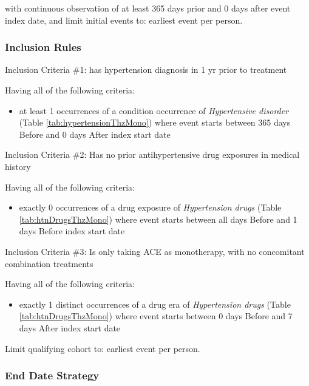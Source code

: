 \documentclass[11pt]{book}
\providecommand{\tightlist}{%
  \setlength{\itemsep}{0pt}\setlength{\parskip}{0pt}}
\theoremstyle{definition}
\theoremstyle{definition}
\theoremstyle{definition}
\theoremstyle{remark}
\begin{document}
with continuous observation of at least 365 days prior and 0 days after
event index date, and limit initial events to: earliest event per
person.

\subsubsection*{Inclusion Rules}\label{inclusion-rules-1}

Inclusion Criteria \#1: has hypertension diagnosis in 1 yr prior to
treatment

Having all of the following criteria:

\begin{itemize}
\tightlist
\item
  at least 1 occurrences of a condition occurrence of \emph{Hypertensive
  disorder} (Table \ref{tab:hypertensionThzMono}) where event starts
  between 365 days Before and 0 days After index start date
\end{itemize}

Inclusion Criteria \#2: Has no prior antihypertensive drug exposures in
medical history

Having all of the following criteria:

\begin{itemize}
\tightlist
\item
  exactly 0 occurrences of a drug exposure of \emph{Hypertension drugs}
  (Table \ref{tab:htnDrugsThzMono}) where event starts between all days
  Before and 1 days Before index start date
\end{itemize}

Inclusion Criteria \#3: Is only taking ACE as monotherapy, with no
concomitant combination treatments

Having all of the following criteria:

\begin{itemize}
\tightlist
\item
  exactly 1 distinct occurrences of a drug era of \emph{Hypertension
  drugs} (Table \ref{tab:htnDrugsThzMono}) where event starts between 0
  days Before and 7 days After index start date
\end{itemize}

Limit qualifying cohort to: earliest event per person.

\subsubsection*{End Date Strategy}\label{end-date-strategy-4}
\end{document}
